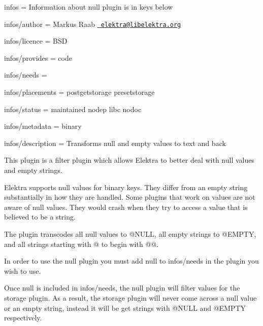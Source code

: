 
\begin{DoxyItemize}
\item infos = Information about null plugin is in keys below
\item infos/author = Markus Raab \href{mailto:elektra@libelektra.org}{\texttt{ elektra@libelektra.\+org}}
\item infos/licence = B\+SD
\item infos/provides = code
\item infos/needs =
\item infos/placements = postgetstorage presetstorage
\item infos/status = maintained nodep libc nodoc
\item infos/metadata = binary
\item infos/description = Transforms null and empty values to text and back
\end{DoxyItemize}

This plugin is a filter plugin which allows Elektra to better deal with null values and empty strings.

Elektra supports null values for binary keys. They differ from an empty string substantially in how they are handled. Some plugins that work on values are not aware of null values. They would crash when they try to access a value that is believed to be a string.

The plugin transcodes all null values to {\ttfamily @N\+U\+LL}, all empty strings to {\ttfamily @E\+M\+P\+TY}, and all strings starting with {\ttfamily @} to begin with {\ttfamily @@}.

In order to use the {\ttfamily null} plugin you must add {\ttfamily null} to {\ttfamily infos/needs} in the plugin you wish to use.

Once {\ttfamily null} is included in {\ttfamily infos/needs}, the null plugin will filter values for the storage plugin. As a result, the storage plugin will never come across a null value or an empty string, instead it will be get strings with {\ttfamily @N\+U\+LL} and {\ttfamily @E\+M\+P\+TY} respectively. 